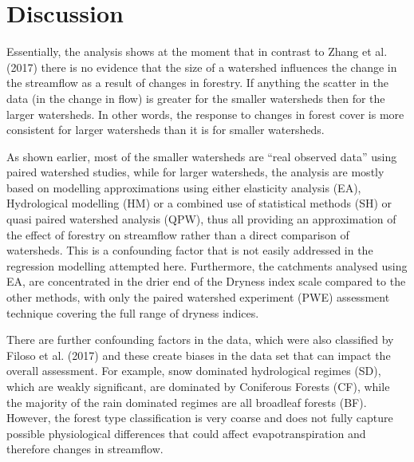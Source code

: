 \documentclass[]{elsarticle} %
\newenvironment{Shaded}{\begin{snugshade}}{\end{snugshade}}
\newcommand{\DataTypeTok}[1]{\textcolor[rgb]{0.13,0.29,0.53}{#1}}
\newcommand{\DecValTok}[1]{\textcolor[rgb]{0.00,0.00,0.81}{#1}}
\newcommand{\KeywordTok}[1]{\textcolor[rgb]{0.13,0.29,0.53}{\textbf{#1}}}
\newcommand{\NormalTok}[1]{#1}
\newcommand{\OperatorTok}[1]{\textcolor[rgb]{0.81,0.36,0.00}{\textbf{#1}}}
\newcommand{\StringTok}[1]{\textcolor[rgb]{0.31,0.60,0.02}{#1}}
\begin{document}
\begin{Shaded}
\end{Shaded}

\hypertarget{discussion}{%
\section{Discussion}\label{discussion}}

Essentially, the analysis shows at the moment that in contrast to Zhang
et al. (2017) there is no evidence that the size of a watershed
influences the change in the streamflow as a result of changes in
forestry. If anything the scatter in the data (in the change in flow) is
greater for the smaller watersheds then for the larger watersheds. In
other words, the response to changes in forest cover is more consistent
for larger watersheds than it is for smaller watersheds.

As shown earlier, most of the smaller watersheds are ``real observed
data'' using paired watershed studies, while for larger watersheds, the
analysis are mostly based on modelling approximations using either
elasticity analysis (EA), Hydrological modelling (HM) or a combined use
of statistical methods (SH) or quasi paired watershed analysis (QPW),
thus all providing an approximation of the effect of forestry on
streamflow rather than a direct comparison of watersheds. This is a
confounding factor that is not easily addressed in the regression
modelling attempted here. Furthermore, the catchments analysed using EA,
are concentrated in the drier end of the Dryness index scale compared to
the other methods, with only the paired watershed experiment (PWE)
assessment technique covering the full range of dryness indices.

There are further confounding factors in the data, which were also
classified by Filoso et al. (2017) and these create biases in the data
set that can impact the overall assessment. For example, snow dominated
hydrological regimes (SD), which are weakly significant, are dominated
by Coniferous Forests (CF), while the majority of the rain dominated
regimes are all broadleaf forests (BF). However, the forest type
classification is very coarse and does not fully capture possible
physiological differences that could affect evapotranspiration and
therefore changes in streamflow.
\end{document}
